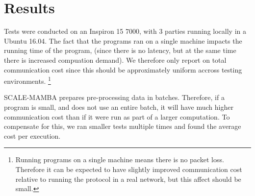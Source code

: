 \section{Results}

Tests were conducted on an Inspiron 15 7000, with 3 parties
running locally in a Ubuntu 16.04.
The fact that the programs ran on a single machine impacts
the running time of the program, (since there is no latency,
but at the same time there is increased compuation demand).
We therefore only report on total communication cost
since this should be approximately uniform accross testing
environments. 
\footnote{Running programs on a single machine means there
is no packet loss. Therefore it can be expected to have
slightly improved communication cost relative to running
the protocol in a real network, but this affect should be small.}

SCALE-MAMBA prepares pre-processing data in batches.
Therefore, if a program is small, and does not use 
an entire batch, it will have much higher communication cost
than if it were run as part of a larger computation.
To compensate for this, we ran smaller tests multiple times and 
found the average cost per execution.



